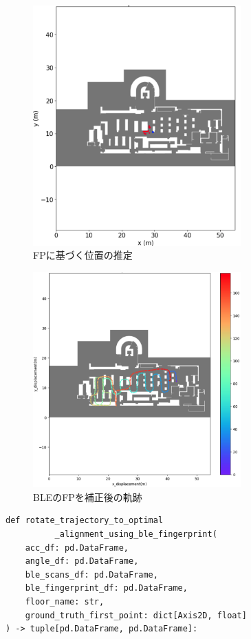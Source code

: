 \begin{figure}[ht]
	\centering
	\includegraphics[width=80mm]{image/fingerprint-location.jpg}
	\caption{FPに基づく位置の推定}    \label{fig:fingerprint-location}
\end{figure}


\begin{figure}[ht]
	\centering
	\includegraphics[width=80mm]{image/fingerprint-rotate.jpg}
	\caption{BLEのFPを補正後の軌跡}    \label{fig:fingerprint-rotate}
\end{figure}

\begin{lstlisting}[caption={BLEビーコンのFPを使用した\\初期進行方向補正}, label=lst:rotate-trajectory-using-ble-fingerprint,float =h]
def rotate_trajectory_to_optimal
          _alignment_using_ble_fingerprint(
    acc_df: pd.DataFrame,
    angle_df: pd.DataFrame,
    ble_scans_df: pd.DataFrame,
    ble_fingerprint_df: pd.DataFrame,
    floor_name: str,
    ground_truth_first_point: dict[Axis2D, float]
) -> tuple[pd.DataFrame, pd.DataFrame]:                                        
\end{lstlisting}
